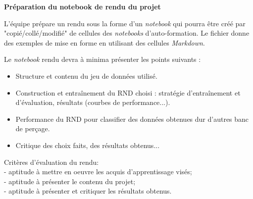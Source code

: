 \documentclass[11pt,french]{article}
\newcommand{\VDB}[1]{\VeryDarkBlue{#1}}
\newcommand{\file}[1]{{\ttfamily \VDB{#1}}}
\begin{document}
\begin {bclogo}[noborder=true, couleurBarre=Chocolate, logo=\bctrombone]{}
  \vspace*{-4mm}\textbf{Préparation du notebook de rendu du projet}

L'équipe prépare un rendu sous la forme d'un {\em notebook} qui pourra être créé par "copié/collé/modifié" de cellules des {\em notebooks} d'auto-formation.
Le fichier \file{template.ipynb} donne des exemples de mise en forme en utilisant des cellules {\em Markdown}.

Le {\em notebook} rendu devra à minima présenter les points suivants :
\begin{itemize}
\item Structure et contenu du jeu de données utilisé.
\item Construction et entraînement du RND choisi : stratégie d'entraînement et d'évaluation, résultats (courbes de performance...).
\item Performance du RND pour classifier des données obtenues dur d'autres banc de perçage.
\item Critique des choix faits, des résultats obtenus...
\end{itemize}
\end{bclogo}  
%
\vspace*{-2mm}
\bigskip
Critères d'évaluation du rendu: \\
- aptitude à mettre en oeuvre les acquis d'apprentissage visés;\\
- aptitude à présenter le contenu du projet;\\
- aptitude à présenter et critiquer les résultats obtenus.\\
\end{document}
